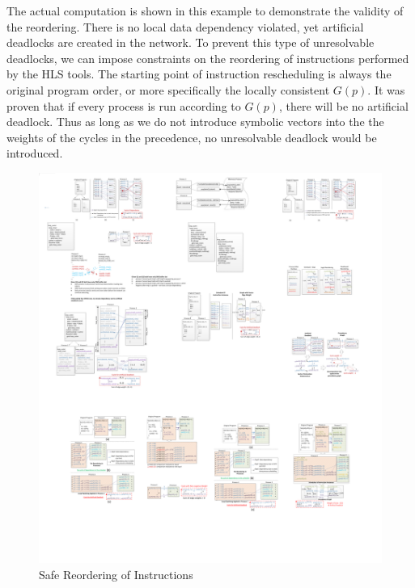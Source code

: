 The actual computation is shown
in this example to demonstrate the validity of the reordering. There is no local data dependency violated, yet artificial deadlocks are created in the network.
To prevent this type of unresolvable deadlocks, we can impose constraints on the
reordering of instructions performed by the HLS tools. The starting point of
instruction rescheduling is always the original program order, or more specifically the locally consistent $G(p)$. 
It was proven that if every process is run according to $G(p)$, there will be no artificial deadlock. Thus as long as we do not introduce symbolic vectors into the the weights of the cycles in the precedence, no unresolvable deadlock would be introduced.
\begin{figure}[htp]
\begin{center}
\includegraphics[width=1.0\linewidth]{chap4fig/safeRule2.pdf}
\caption{Safe Reordering of Instructions
\label{fig:safeReschdule}}
\end{center}
\end{figure}



